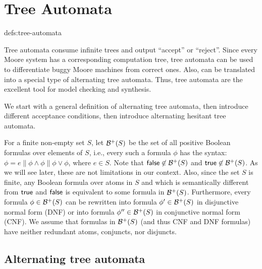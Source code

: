 \toclesslab\section{Tree Automata}{defs:tree-automata}

Tree automata consume infinite trees and output ``accept'' or ``reject''.
Since every Moore system has a corresponding computation tree,
tree automata can be used to differentiate buggy Moore machines from correct ones.
Also, \CTLstar can be translated into a special type of alternating tree automata.
Thus, tree automata are the excellent tool for model checking and synthesis.

We start with a general definition of alternating tree automata,
then introduce different acceptance conditions,
then introduce alternating hesitant tree automata.

For a finite non-empty set $S$,
let ${\cal B}^+(S)$ be the set of all positive Boolean formulas over elements of $S$,
i.e., every such a formula $\phi$ has the syntax:
$\phi = e \| \phi \land \phi \| \phi \lor \phi$, where $e \in S$.
Note that $\textsf{false} \not\in {\cal B}^+(S)$ and $\textsf{true} \not\in {\cal B}^+(S)$.
As we will see later, these are not limitations in our context.
Also, since the set $S$ is finite,
any Boolean formula over atoms in $S$ and which is semantically different from $\textsf{true}$ and $\textsf{false}$
is equivalent to some formula in ${\cal B}^+(S)$.
Furthermore,
every formula $\phi \in {\cal B}^+(S)$ can be rewritten into formula $\phi' \in {\cal B}^+(S)$ in disjunctive normal form (DNF)
or into formula $\phi'' \in {\cal B}^+(S)$ in conjunctive normal form (CNF).
We assume that formulas in ${\cal B}^+(S)$ (and thus CNF and DNF formulas)
have neither redundant atoms, conjuncts, nor disjuncts.



\subsection*{Alternating tree automata}

